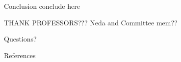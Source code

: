 \documentclass[10pt]{beamer}
\theoremstyle{plain}
\theoremstyle{definition}
\begin{document}
\begin{frame}{Conclusion}
	conclude here
	\cite{FromScenariosToTimedAutomata-2016}
	\cite{OptimalClockAllocationTA}
\end{frame}

\begin{frame}[standout]
THANK PROFESSORS???
Neda and Committee mem??
\end{frame}
\begin{frame}[standout]
	Questions?
\end{frame}


\begin{frame}[allowframebreaks]{References}
	
	
\end{frame}
\end{document}
